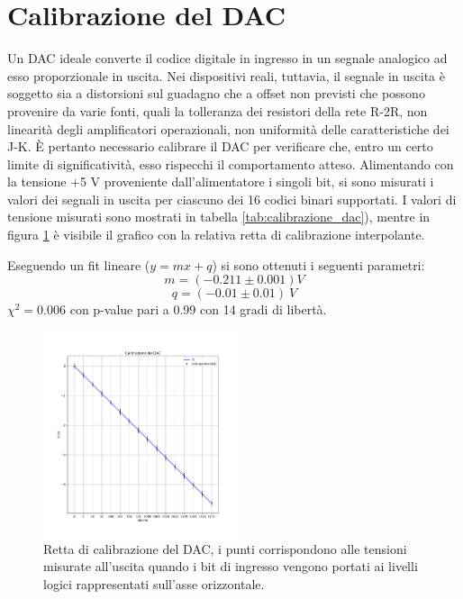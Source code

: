 \documentclass[journal]{IEEEtran}
\begin{document}

\section{Calibrazione del DAC}

Un DAC ideale converte il codice digitale in ingresso in un segnale analogico ad esso proporzionale in uscita. Nei dispositivi reali, tuttavia, il segnale in uscita è soggetto sia a distorsioni sul guadagno che a offset non previsti che possono provenire da varie fonti, quali la tolleranza dei resistori della rete R-2R, non linearità degli amplificatori operazionali, non uniformità delle caratteristiche dei J-K.
È pertanto necessario calibrare il DAC per verificare che, entro un certo limite di significatività, esso rispecchi il comportamento atteso.
Alimentando con la tensione +5 V proveniente dall'alimentatore i singoli bit, si sono misurati i valori dei segnali in uscita per ciascuno dei 16 codici binari supportati. I valori di tensione misurati sono mostrati in tabella \ref{tab:calibrazione_dac}), mentre in figura \ref{fig:graph_calibrazione_dac} è visibile il grafico con la relativa retta di calibrazione interpolante.


Eseguendo un fit lineare ($y = mx + q$) si sono ottenuti i seguenti parametri: 
\[ m = (-0.211 \pm 0.001) V \] 
\[ q = (-0.01 \pm 0.01) \ V \] 
$ \chi^{2} = 0.006 $ con p-value pari a $0.99$ con 14 gradi di libertà.

\begin{figure}[H]%
\centering
\begin{center}
\includegraphics[width=0.51\textwidth]{analysis/output/calibrazione_dac.pdf}
\end{center}
\caption{Retta di calibrazione del DAC, i punti corrispondono alle tensioni misurate all'uscita quando i bit di ingresso vengono portati ai livelli logici rappresentati sull'asse orizzontale.}
\label{fig:graph_calibrazione_dac}
\end{figure}
\end{document}
